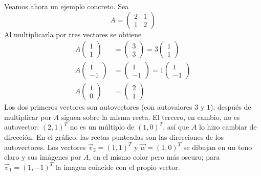 \documentclass{article}
\newcommand{\vect}[1]{\vec{#1}}
\begin{document}
Veamos ahora un ejemplo concreto. Sea
\[
A=\begin{pmatrix}2&1\\1&2\end{pmatrix}
\]
Al multiplicarla por tres vectores se obtiene
\[
\begin{aligned}
A\begin{pmatrix}1\\1\end{pmatrix}&=\begin{pmatrix}3\\3\end{pmatrix}=3\begin{pmatrix}1\\1\end{pmatrix}\\[6pt]
A\begin{pmatrix}1\\-1\end{pmatrix}&=\begin{pmatrix}1\\-1\end{pmatrix}=1\begin{pmatrix}1\\-1\end{pmatrix}\\[6pt]
A\begin{pmatrix}1\\0\end{pmatrix}&=\begin{pmatrix}2\\1\end{pmatrix}
\end{aligned}
\]
Los dos primeros vectores son autovectores (con autovalores \(3\) y \(1\)): después de multiplicar por \(A\) siguen sobre la misma recta. El tercero, en cambio, no es autovector: \((2,1)^T\) no es un múltiplo de \((1,0)^T\), así que \(A\) lo hizo cambiar de dirección. En el gráfico, las rectas punteadas son las direcciones de los autovectores. Los vectores \(\vect{v}_2=(1,1)^T\) y \(\vect{w}=(1,0)^T\) se dibujan en un tono claro y sus imágenes por \(A\), en el mismo color pero más oscuro; para \(\vect{v}_1=(1,-1)^T\) la imagen coincide con el propio vector.
\end{document}
